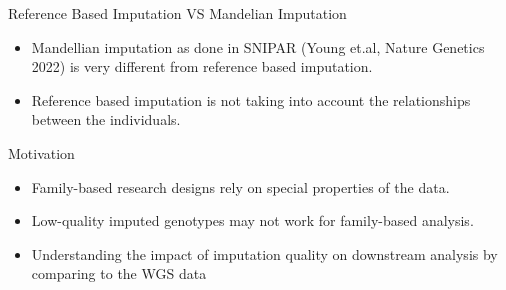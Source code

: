\documentclass{beamer}
\begin{document}
\begin{frame}{Reference Based Imputation VS Mandelian Imputation}
      \begin{itemize}
            \item Mandellian imputation as done in SNIPAR (Young et.al, Nature Genetics 2022) is very different from reference based imputation.
            \vspace{15pt}
            \item Reference based imputation is not taking into account the relationships between the individuals.
      \end{itemize}
\end{frame}

\begin{frame}{Motivation}
      \begin{itemize}
            \item Family-based research designs rely on special properties of the data.
            \vspace{15 pt}
            \item Low-quality imputed genotypes may not work for family-based analysis. %
            \vspace{15 pt}
            \item Understanding the impact of imputation quality on downstream analysis by comparing to the WGS data
      \end{itemize}
\end{frame}
\end{document}
